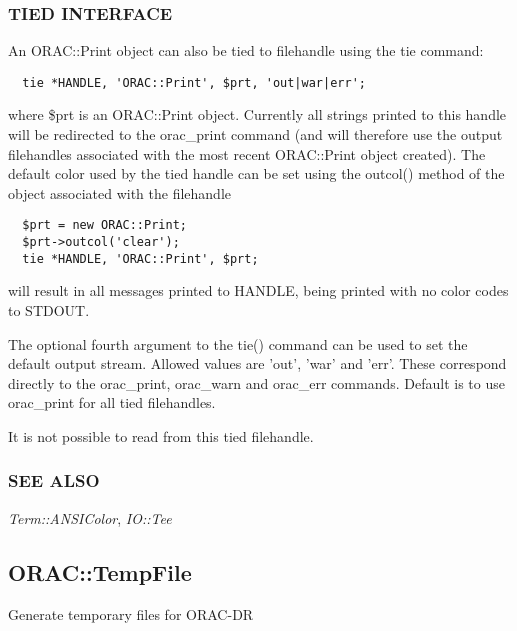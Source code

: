 \subsubsection*{TIED INTERFACE\label{ORAC::Print_TIED_INTERFACE}}

An ORAC::Print object can also be tied to filehandle using the
tie command:

\begin{verbatim}
  tie *HANDLE, 'ORAC::Print', $prt, 'out|war|err';
\end{verbatim}


where \$prt is an ORAC::Print object. Currently all strings printed
to this handle will be redirected to the orac\_print command
(and will therefore use the output filehandles associated with the
most recent ORAC::Print object created). The default color used
by the tied handle can be set using the outcol() method of the
object associated with the filehandle

\begin{verbatim}
  $prt = new ORAC::Print;
  $prt->outcol('clear');
  tie *HANDLE, 'ORAC::Print', $prt;
\end{verbatim}


will result in all messages printed to HANDLE, being printed
with no color codes to STDOUT.



The optional fourth argument to the tie() command can be used
to set the default output stream. Allowed values are 'out',
'war' and 'err'. These correspond directly to the orac\_print,
orac\_warn and orac\_err commands. Default is to use orac\_print
for all tied filehandles.



It is not possible to read from this tied filehandle.

\subsubsection*{SEE ALSO\label{ORAC::Print_SEE_ALSO}}

\emph{Term::ANSIColor}, \emph{IO::Tee}


\subsection{ORAC::TempFile\label{ORAC::TempFile}}

Generate temporary files for ORAC-DR

